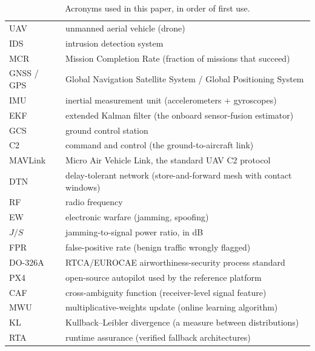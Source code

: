 \documentclass[conference]{IEEEtran}
\begin{document}
\begin{table}[t]
\centering
\caption{Acronyms used in this paper, in order of first use.}
\label{tab:acronyms}
\small
\renewcommand{\arraystretch}{1.12}
\begin{tabularx}{\columnwidth}{@{}lX@{}}
\toprule
UAV & unmanned aerial vehicle (drone)\\
IDS & intrusion detection system\\
MCR & Mission Completion Rate (fraction of missions that succeed)\\
GNSS / GPS & Global Navigation Satellite System / Global Positioning System\\
IMU & inertial measurement unit (accelerometers + gyroscopes)\\
EKF & extended Kalman filter (the onboard sensor-fusion estimator)\\
GCS & ground control station\\
C2 & command and control (the ground-to-aircraft link)\\
MAVLink & Micro Air Vehicle Link, the standard UAV C2 protocol\\
DTN & delay-tolerant network (store-and-forward mesh with contact windows)\\
RF & radio frequency\\
EW & electronic warfare (jamming, spoofing)\\
$J/S$ & jamming-to-signal power ratio, in dB\\
FPR & false-positive rate (benign traffic wrongly flagged)\\
DO-326A & RTCA/EUROCAE airworthiness-security process standard\\
PX4 & open-source autopilot used by the reference platform\\
CAF & cross-ambiguity function (receiver-level signal feature)\\
MWU & multiplicative-weights update (online learning algorithm)\\
KL & Kullback--Leibler divergence (a measure between distributions)\\
RTA & runtime assurance (verified fallback architectures)\\
\bottomrule
\end{tabularx}
\end{table}
\end{document}
